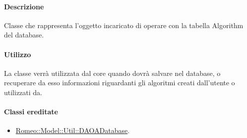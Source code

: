 \paragraph{Descrizione \\}
Classe che rappresenta l'oggetto incaricato di operare con la tabella Algorithm del database.
\paragraph{Utilizzo\\}
La classe verrà utilizzata dal core quando dovrà salvare nel database, o recuperare da esso informazioni riguardanti gli algoritmi creati dall'utente o utilizzati da\project.

\paragraph{Classi ereditate\\}
	\begin{itemize}
		\item \hyperref[speadatabase]{Romeo::Model::Util::DAOADatabase}.
	\end{itemize}
